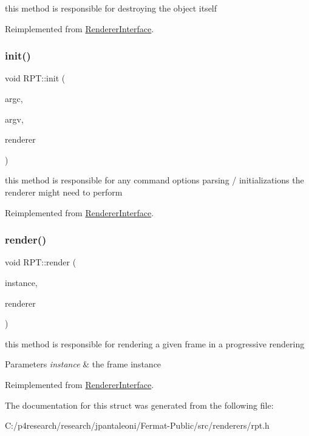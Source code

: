 this method is responsible for destroying the object itself 

Reimplemented from \hyperlink{struct_renderer_interface_a7469218aafa029a3e22bac2c00dca9f5}{Renderer\+Interface}.

\mbox{\label{struct_r_p_t_ae840ee9e9ef3939729ef0bb653c19f9e}} 
\subsubsection{\texorpdfstring{init()}{init()}}
{\footnotesize\ttfamily void R\+P\+T\+::init (\begin{DoxyParamCaption}\item[{int}]{argc,  }\item[{char $\ast$$\ast$}]{argv,  }\item[{\hyperlink{struct_rendering_context}{Rendering\+Context} \&}]{renderer }\end{DoxyParamCaption})\hspace{0.3cm}{\ttfamily [virtual]}}

this method is responsible for any command options parsing / initializations the renderer might need to perform 

Reimplemented from \hyperlink{struct_renderer_interface_a2ead9b943d6d48fcd32872e0005ebe63}{Renderer\+Interface}.

\mbox{\label{struct_r_p_t_a03e6ba660d7750e633ec69de179e48e7}} 
\subsubsection{\texorpdfstring{render()}{render()}}
{\footnotesize\ttfamily void R\+P\+T\+::render (\begin{DoxyParamCaption}\item[{const uint32}]{instance,  }\item[{\hyperlink{struct_rendering_context}{Rendering\+Context} \&}]{renderer }\end{DoxyParamCaption})\hspace{0.3cm}{\ttfamily [virtual]}}

this method is responsible for rendering a given frame in a progressive rendering


\begin{DoxyParams}{Parameters}
{\em instance} & the frame instance \\
\hline
\end{DoxyParams}


Reimplemented from \hyperlink{struct_renderer_interface_aa64254dd44c94929b05092dc8d74f29d}{Renderer\+Interface}.



The documentation for this struct was generated from the following file\+:\begin{DoxyCompactItemize}
\item 
C\+:/p4research/research/jpantaleoni/\+Fermat-\/\+Public/src/renderers/rpt.\+h\end{DoxyCompactItemize}
